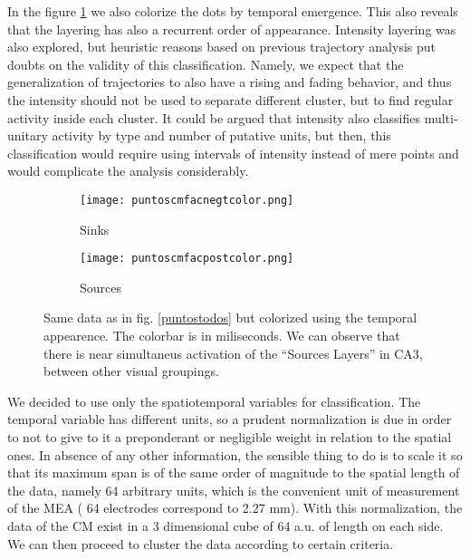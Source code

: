 \documentclass{article}
\begin{document}
In the figure \ref{puntosconcolor} we also colorize the dots by temporal emergence.
This also reveals that the layering has also a recurrent order of appearance. Intensity
layering was also explored, but heuristic reasons based on previous trajectory
analysis put doubts on the validity of this classification. Namely, we expect
that the generalization of trajectories to also have a rising and fading behavior,
and thus the intensity should not be used to separate different cluster, but to
find regular activity inside each cluster. It could be argued that intensity also
classifies multi-unitary activity by type and number of putative units, but then,
this classification would require using intervals of intensity instead of mere
points and would complicate the analysis considerably.


\begin{figure}
\centering
\begin{subfigure}{0.40\textwidth}
\texttt{[image: puntoscmfacnegtcolor.png]}
\caption{Sinks}
\end{subfigure}
\begin{subfigure}{0.40\textwidth}
\texttt{[image: puntoscmfacpostcolor.png]}
\caption{Sources}
\end{subfigure}

\caption{Same data as in fig. \ref{puntostodos} but colorized using
the temporal appearence. The colorbar is in miliseconds. We can observe
that there is near simultaneus activation of the ``Sources Layers'' in CA3,
between other visual groupings. 
}\label{puntosconcolor}

\end{figure}


We decided to  use only the spatiotemporal variables for classification. 
The temporal variable has different units, so a prudent normalization is due
in order to not to give to it a preponderant or negligible weight in relation to the
spatial ones. In absence of any other information, the sensible thing to do is to
scale it so that its maximum span is of the same order of magnitude to the
spatial length of the data, namely 64 arbitrary units, which is the convenient unit
of measurement of the MEA ( 64 electrodes correspond to 2.27 mm).
With this normalization, the data of the CM exist in a 3 dimensional cube of 64 a.u.
of length on each side. We can then proceed to cluster the data according to
certain criteria.
\end{document}

